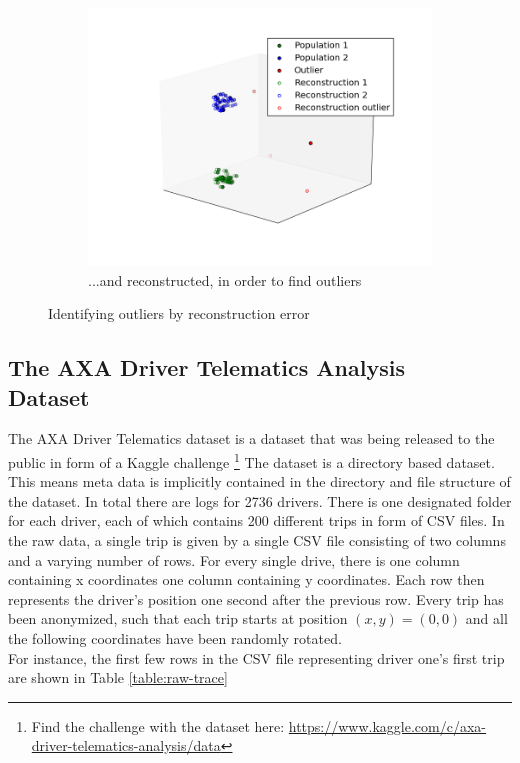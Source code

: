 \documentclass{vldb}
\begin{document}
\begin{figure}
\begin{subfigure}{.5\textwidth}
  \centering
  \includegraphics[width=.9\linewidth]{"pics/reconstruction"}
  \caption{...and reconstructed, in order to find outliers}
  \label{subfig:reduction-c}
\end{subfigure}
\caption{Identifying outliers by reconstruction error}
\label{fig:auto-encoder-reconstruction}
\end{figure}

\subsection{The AXA Driver Telematics Analysis \\Dataset}
\label{subsec:Metho-dataset}
The AXA Driver Telematics dataset is a dataset that was being released to the public in form of a Kaggle challenge 
\footnote{Find the challenge with the dataset here: \url{https://www.kaggle.com/c/axa-driver-telematics-analysis/data}}
The dataset is a directory based dataset. This means meta data is implicitly contained in the directory and file structure of the dataset. In total there are logs for 2736 drivers. There is one designated folder for each driver, each of which contains 200 different trips in form of CSV files. In the raw data, a single trip is given by a single CSV file consisting of two columns and a varying number of rows. For every single drive, there is one column containing x coordinates one column containing y coordinates. Each row then represents the driver's position one second after the previous row. Every trip has been anonymized, such that each trip starts at position $(x, y) = (0, 0)$ and all the following coordinates have been randomly rotated.\\ 
For instance, the first few rows in the CSV file representing driver one's first trip are shown in Table \ref{table:raw-trace}
\end{document}
